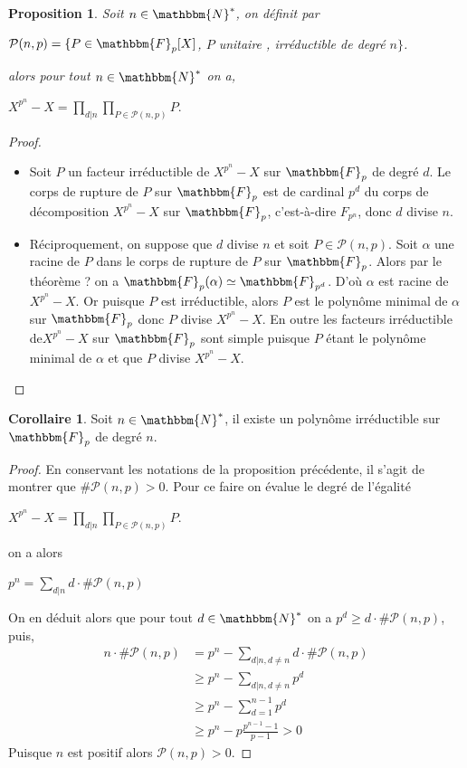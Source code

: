\documentclass[12pt]{article}
\newcommand{\N}{\mathbbm{N}}
\newcommand{\F}{\mathbbm{F}}
\newtheorem{prop}{Proposition}
\theoremstyle{definition}
\newtheorem{coro}{Corollaire}
\begin{document}
\begin{prop}
Soit $n \in \N^{*}$, on définit par
\begin{center}
$\mathcal{P} (n,p) = \{ P \in \F_p [X]$, $P$ unitaire , irréductible de degré $n \}$.
\end{center}
alors pour tout $n \in \N^{*}$ on a,
\begin{center}
$\displaystyle X^{p^n} - X = \prod_{d | n} \prod_{P \in \mathcal{P}(n,p)} P.$
\end{center}
\end{prop}
\begin{proof}
\begin{itemize}
\item Soit $P$ un facteur irréductible de $X^{p^n} - X$ sur $\F_p$ de degré $d$. Le corps de rupture de $P$ sur $\F_p$ est de cardinal $p^d$ du corps de décomposition $X^{p^n} - X$ sur $\F_p$, c'est-à-dire $F_{p^n}$, donc $d$ divise $n$.
\item Réciproquement, on suppose que $d$ divise $n$ et soit $P \in \mathcal{P} (n,p)$. Soit $\alpha$ une racine de $P$ dans le corps de rupture de $P$ sur $\F_p$. Alors par le théorème ? on a $\F_p (\alpha) \simeq \F_{p^d}$. D'où $\alpha$ est racine de $X^{p^n} - X$. Or puisque $P$ est irréductible, alors $P$ est le polynôme minimal de $\alpha$ sur $\F_p$ donc $P$ divise $X^{p^n} - X$. En outre les facteurs irréductible de$X^{p^n} - X$ sur $\F_p$ sont simple puisque $P$ étant le polynôme minimal de $\alpha$ et que $P$ divise $X^{p^n} - X$.
\end{itemize}
\end{proof}
\begin{coro}
Soit $n \in \N^{*}$, il existe un polynôme irréductible sur $\F_p$ de degré $n$.
\end{coro}
\begin{proof}
En conservant les notations de la proposition précédente, il s'agit de montrer que $\# \mathcal{P} (n,p) > 0$. Pour ce faire on évalue le degré de l'égalité
\begin{center}
$\displaystyle X^{p^n} - X = \prod_{d | n} \prod_{P \in \mathcal{P}(n,p)} P.$
\end{center}
on a alors
\begin{center}
$\displaystyle p^n = \sum_{d | n} d \cdot \# \mathcal{P} (n,p)$
\end{center}
On en déduit alors que pour tout $d \in \N^{*}$ on a $p^d \geq d \cdot \# \mathcal{P} (n,p)$, puis,
\begin{align*}
\displaystyle
n \cdot \# \mathcal{P} (n,p) &= p^n - \sum_{d | n , d \neq n} d \cdot \# \mathcal{P} (n,p)\\
&\geq p^n - \sum_{d | n , d \neq n} p^d\\
&\geq p^n - \sum_{d =1}^{n-1} p^d\\
&\geq p^n - p \frac{p^{n-1} - 1}{p-1} > 0
\end{align*}
Puisque $n$ est positif alors $\mathcal{P} (n,p) > 0$.
\end{proof}
\pagebreak 
\end{document}
